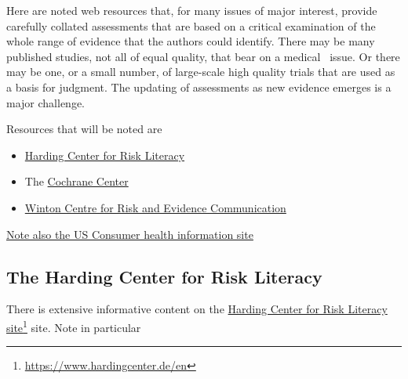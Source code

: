\documentclass[
  10pt,
  b5paper]{book}
\providecommand{\tightlist}{%
  \setlength{\itemsep}{0pt}\setlength{\parskip}{0pt}}
\begin{document}
Here are noted web resources that, for many issues of major
interest, provide carefully collated assessments that are
based on a critical examination of the whole range of evidence
that the authors could identify. There may be many
published studies, not all of equal quality, that bear on a medical~
issue. Or there may be one, or a small number, of large-scale high
quality trials that are used as a basis for judgment. The updating
of assessments as new evidence emerges is a major challenge.

Resources that will be noted are

\begin{itemize}
\tightlist
\item
  \href{https://www.hardingcenter.de/en}{Harding Center for Risk Literacy}
\item
  The \href{https://www.cochrane.org/}{Cochrane Center}
\item
  \href{https://wintoncentre.maths.cam.ac.uk/}{Winton Centre for Risk and Evidence Communication}
\end{itemize}

\href{https://medlineplus.gov/}{Note also the US Consumer health information site}

\hypertarget{the-harding-center-for-risk-literacy}{%
\subsection*{The Harding Center for Risk Literacy}\label{the-harding-center-for-risk-literacy}}

There is extensive informative content on the \href{https://www.hardingcenter.de/en}{Harding Center for Risk Literacy site}\footnote{\url{https://www.hardingcenter.de/en}} site. Note in particular
\end{document}
